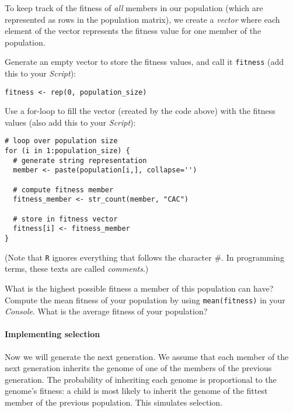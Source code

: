 \documentclass[a4paper, 9pt]{article}
\begin{document}
To keep track of the fitness of \textit{all} members in our population
(which are represented as rows in the population matrix), we create a
\textit{vector} where each element of the vector represents
the fitness value for one member of the population.

\begin{exercise}
    \action Generate an empty vector to store the fitness values, and call it \texttt{fitness} (add this to your \emph{Script}):
    \begin{lstlisting}
fitness <- rep(0, population_size)
    \end{lstlisting}
    \action Use a for-loop to fill the vector (created by the code above) with the fitness values (also add this to your \emph{Script}):
    \begin{lstlisting}[otherkeywords={str_count}]
# loop over population size
for (i in 1:population_size) {      
  # generate string representation
  member <- paste(population[i,], collapse='') 
  
  # compute fitness member   
  fitness_member <- str_count(member, "CAC")   
  
  # store in fitness vector
  fitness[i] <- fitness_member
}
\end{lstlisting}
    
    (Note that \texttt{R} ignores everything that follows the character \#. In programming terms, these texts are called \textit{comments}.)
    
    What is the highest possible fitness a member of this population can have?
    \action Compute the mean fitness of your population by using \verb|mean(fitness)| in your \emph{Console}.
    What is the average fitness of your population?
\end{exercise}

\paragraph{Implementing selection} Now we will generate the next generation. We assume that each member of
the next generation inherits the genome of one of the members of the
previous generation. The probability of inheriting each genome is
proportional to the genome's fitness: a child is most likely to inherit
the genome of the fittest member of the previous population. This
simulates selection.
\end{document}
